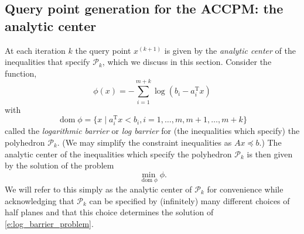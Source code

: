 \documentclass[11pt]{amsart}
\theoremstyle{definition}
\theoremstyle{remark}
\newcommand{\transpose}{\text{T}}
\DeclareMathOperator{\domain}{dom}
\begin{document}
    \subsection{Query point generation for the ACCPM: the analytic center}
        At each iteration $k$ the query point $x^{(k+1)}$ is given by the \emph{analytic center} of the inequalities that specify $\mathcal{P}_k$, which we discuss in this section. Consider the function,
        \begin{equation}
            \phi(x) = - \sum_{i=1}^{m+k}{\log{(b_i - a_i^\transpose x)}}
        \end{equation}
        with 
        \begin{equation}
            \domain \phi = \{x \;|\; a_i^\transpose x < b_i, i = 1, \dots, m, m+1, \dots, m+k\}
        \end{equation}
        called the \emph{logarithmic barrier} or \emph{log barrier} for (the inequalities which specify) the polyhedron $\mathcal{P}_k$. (We may simplify the constraint inequalities as $Ax \preceq b$.) The analytic center of the inequalities which specify the polyhedron $\mathcal{P}_k$ is then given by the solution of the problem 
        \begin{equation}\label{e:log_barrier_problem}
            \min_{\domain \phi} \phi.
        \end{equation}
        We will refer to this simply as the analytic center of $\mathcal{P}_k$ for convenience while acknowledging that $\mathcal{P}_k$ can be specified by (infinitely) many different choices of half planes and that this choice determines the solution of \eqref{e:log_barrier_problem}.
\end{document}
